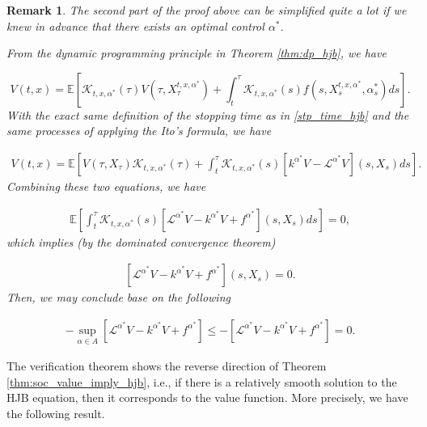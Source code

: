 \documentclass{article}
\newtheorem{rk}{Remark}
\begin{document}
\begin{rk}
The second part of the proof above can be simplified quite a lot if we knew in advance that there exists an optimal control $\alpha^*$. 

From the dynamic programming principle in Theorem \ref{thm:dp_hjb}, we have 

\begin{equation*}
V(t,x)=\mathbb{E}\left[\mathcal{K}_{t,x,\alpha^*}(\tau)V(\tau,X_\tau^{t,x,\alpha^*})+\int^\tau_t\mathcal{K}_{t,x,\alpha^*}(s)f(s,X_s^{t,x,\alpha^*},\alpha^*_s)ds\right].
\end{equation*}
With the exact same definition of the stopping time as in \eqref{stp_time_hjb} and the same processes of applying the Ito's formula, we have

\begin{equation*}
\begin{aligned}
V(t,x)=\mathbb{E}\left[V(\tau,X_\tau)\mathcal{K}_{t,x,\alpha^*}(\tau)+\int^\tau_t\mathcal{K}_{t,x,\alpha^*}(s)[k^{\alpha^*}V-\mathcal{L}^{\alpha^*}V](s,X_s)ds\right].
\end{aligned}
\end{equation*}
Combining these two equations, we have

\begin{equation*}
\begin{aligned}
\mathbb{E}\left[\int^\tau_t\mathcal{K}_{t,x,\alpha^*}(s)[\mathcal{L}^{\alpha^*}V-k^{\alpha^*}V+f^{\alpha^*}](s,X_s)ds\right]=0,
\end{aligned}
\end{equation*}
which implies (by the dominated convergence theorem)

\begin{equation*}
\begin{aligned}
[\mathcal{L}^{\alpha^*}V-k^{\alpha^*}V+f^{\alpha^*}](s,X_s)=0.
\end{aligned}
\end{equation*}
 Then, we may conclude base on the following

\begin{equation*}
\begin{aligned}
-\sup_{\alpha\in A}[\mathcal{L}^{\alpha^*}V-k^{\alpha^*}V+f^{\alpha^*}]\leq-[\mathcal{L}^{\alpha^*}V-k^{\alpha^*}V+f^{\alpha^*}]=0.
\end{aligned}
\end{equation*}

\end{rk}

The verification theorem shows the reverse direction of Theorem \ref{thm:soc_value_imply_hjb}, i.e., if there is a relatively smooth solution to the HJB equation, then it corresponds to the value function. More precisely, we have the following result. 
\end{document}
